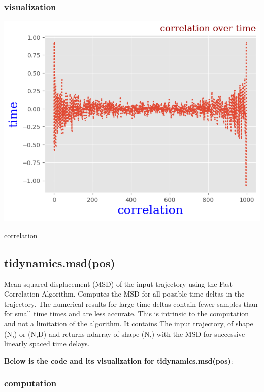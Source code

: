 \documentclass[12pt, a4paper, twoside]{report}
\begin{document}
\subsubsection{visualization}

\begin{center}
    \centering
    \includegraphics[width=1.1\textwidth , height=.6\paperheight]{figure_correlaion.png}
    \caption{correlation}
\end{center}

\newpage
\subsection{tidynamics.msd(pos)}

Mean-squared displacement (MSD) of the input trajectory using the Fast Correlation Algorithm.
Computes the MSD for all possible time deltas in the trajectory. The numerical results for large time deltas contain fewer samples than for small time times and are less accurate. This is intrinsic to the computation and not a limitation of the algorithm.\newline
It contains The input trajectory, of shape (N,) or (N,D) and returns ndarray of shape (N,) with the MSD for successive linearly spaced time delays.

\textbf{Below is the code and its visualization for tidynamics.msd(pos)}:
\subsubsection{computation}
\small
\end{document}
